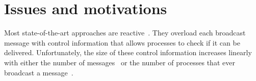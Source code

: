 
\section{Issues and motivations}
\label{sec:motivations}

Most state-of-the-art approaches are
reactive~\cite{almeida2008interval,fidge1988timestamps,hadzilacos1993fault,mattern1989virtual,mostefaoui2017probabilistic,singhal1992efficient}. They
overload each broadcast message with control information that allows processes
to check if it can be delivered. Unfortunately, the size of these control
information increases linearly with either the number of
messages~\cite{hadzilacos1993fault} or the number of processes that ever
broadcast a
message~\cite{almeida2008interval,fidge1988timestamps,mattern1989virtual,mostefaoui2017probabilistic,singhal1992efficient}.


